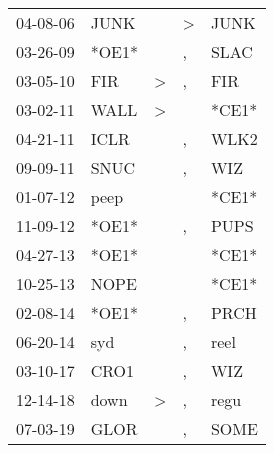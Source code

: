 \begin{supertabular}{p{0.07\textwidth}p{0.06\textwidth}p{0.02\textwidth}p{0.02\textwidth}p{0.06\textwidth}}
 04-08-06\textsuperscript{} &           JUNK\textsuperscript{} &                  &  \textgreater &  JUNK\textsuperscript{} \\
 03-26-09\textsuperscript{} &                            *OE1* &                  &             , &  SLAC\textsuperscript{} \\
 03-05-10\textsuperscript{} &            FIR\textsuperscript{} &     \textgreater &             , &   FIR\textsuperscript{} \\
 03-02-11\textsuperscript{} &           WALL\textsuperscript{} &     \textgreater &               &                   *CE1* \\
 04-21-11\textsuperscript{} &           ICLR\textsuperscript{} &                  &             , &  WLK2\textsuperscript{} \\
 09-09-11\textsuperscript{} &           SNUC\textsuperscript{} &                  &             , &   WIZ\textsuperscript{} \\
 01-07-12\textsuperscript{} &           peep\textsuperscript{} &                  &               &                   *CE1* \\
 11-09-12\textsuperscript{} &                            *OE1* &                  &             , &  PUPS\textsuperscript{} \\
 04-27-13\textsuperscript{} &                            *OE1* &                  &               &                   *CE1* \\
 10-25-13\textsuperscript{} &           NOPE\textsuperscript{} &                  &               &                   *CE1* \\
 02-08-14\textsuperscript{} &                            *OE1* &                  &             , &  PRCH\textsuperscript{} \\
 06-20-14\textsuperscript{} &            syd\textsuperscript{} &                  &             , &  reel\textsuperscript{} \\
 03-10-17\textsuperscript{} &           CRO1\textsuperscript{} &                  &             , &   WIZ\textsuperscript{} \\
 12-14-18\textsuperscript{} &           down\textsuperscript{} &     \textgreater &             , &  regu\textsuperscript{} \\
 07-03-19\textsuperscript{} &           GLOR\textsuperscript{} &                  &             , &  SOME\textsuperscript{} \\
\end{supertabular}
